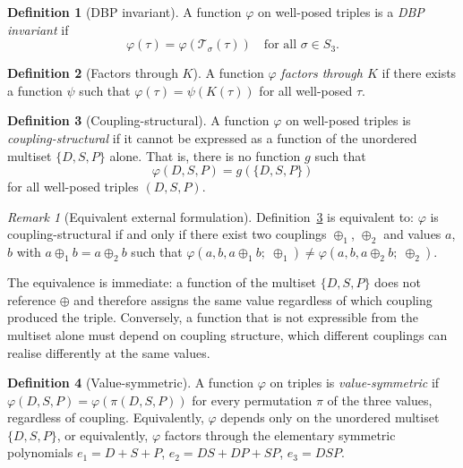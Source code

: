 \documentclass[12pt,a4paper]{article}
\theoremstyle{definition}
\newtheorem{definition}{Definition}
\theoremstyle{plain}
\theoremstyle{remark}
\newtheorem{remark}{Remark}
\newcommand{\T}{\mathcal{T}}
\begin{document}
\begin{definition}[DBP invariant]\label{def:dbp-inv}
A function $\varphi$ on well-posed triples is a \emph{DBP invariant} if
\[
\varphi(\tau) = \varphi(\T_\sigma(\tau)) \quad \text{for all } \sigma \in S_3.
\]
\end{definition}

\begin{definition}[Factors through $K$]\label{def:factors}
A function $\varphi$ \emph{factors through $K$} if there exists a function $\psi$ such that $\varphi(\tau) = \psi(K(\tau))$ for all well-posed $\tau$.
\end{definition}

\begin{definition}[Coupling-structural]\label{def:coupling-structural}
A function $\varphi$ on well-posed triples is \emph{coupling-structural} if it cannot be expressed as a function of the unordered multiset $\{D, S, P\}$ alone. That is, there is no function $g$ such that
\[
\varphi(D, S, P) = g(\{D, S, P\})
\]
for all well-posed triples $(D, S, P)$.
\end{definition}

\begin{remark}[Equivalent external formulation]
Definition~\ref{def:coupling-structural} is equivalent to: $\varphi$ is coupling-structural if and only if there exist two couplings $\oplus_1$, $\oplus_2$ and values $a$, $b$ with $a \oplus_1 b = a \oplus_2 b$ such that $\varphi(a, b, a \oplus_1 b;\; \oplus_1) \neq \varphi(a, b, a \oplus_2 b;\; \oplus_2)$.

The equivalence is immediate: a function of the multiset $\{D,S,P\}$ does not reference $\oplus$ and therefore assigns the same value regardless of which coupling produced the triple. Conversely, a function that is not expressible from the multiset alone must depend on coupling structure, which different couplings can realise differently at the same values.
\end{remark}

\begin{definition}[Value-symmetric]\label{def:value-symmetric}
A function $\varphi$ on triples is \emph{value-symmetric} if $\varphi(D,S,P) = \varphi(\pi(D,S,P))$ for every permutation $\pi$ of the three values, regardless of coupling. Equivalently, $\varphi$ depends only on the unordered multiset $\{D, S, P\}$, or equivalently, $\varphi$ factors through the elementary symmetric polynomials $e_1 = D + S + P$, $e_2 = DS + DP + SP$, $e_3 = DSP$.
\end{definition}
\end{document}

